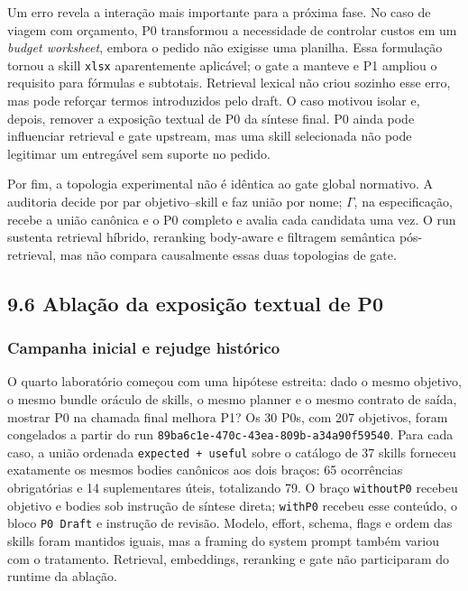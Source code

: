 \documentclass[12pt,a4paper]{article}
\begin{document}
Um erro revela a interação mais importante para a próxima fase. No caso de viagem com orçamento, P0 transformou a necessidade de controlar custos em um \textit{budget worksheet}, embora o pedido não exigisse uma planilha. Essa formulação tornou a skill \texttt{xlsx} aparentemente aplicável; o gate a manteve e P1 ampliou o requisito para fórmulas e subtotais. Retrieval lexical não criou sozinho esse erro, mas pode reforçar termos introduzidos pelo draft. O caso motivou isolar e, depois, remover a exposição textual de P0 da síntese final. P0 ainda pode influenciar retrieval e gate upstream, mas uma skill selecionada não pode legitimar um entregável sem suporte no pedido.

Por fim, a topologia experimental não é idêntica ao gate global normativo. A auditoria decide por par objetivo--skill e faz união por nome; \(\Gamma\), na especificação, recebe a união canônica e o P0 completo e avalia cada candidata uma vez. O run sustenta retrieval híbrido, reranking body-aware e filtragem semântica pós-retrieval, mas não compara causalmente essas duas topologias de gate.

\subsection*{9.6 Ablação da exposição textual de P0}

\subsubsection*{Campanha inicial e rejudge histórico}

O quarto laboratório começou com uma hipótese estreita: dado o mesmo objetivo, o mesmo bundle oráculo de skills, o mesmo planner e o mesmo contrato de saída, mostrar P0 na chamada final melhora P1? Os 30 P0s, com 207 objetivos, foram congelados a partir do run \texttt{89ba6c1e-470c-43ea-809b-a34a90f59540}. Para cada caso, a união ordenada \texttt{expected + useful} sobre o catálogo de 37 skills forneceu exatamente os mesmos bodies canônicos aos dois braços: 65 ocorrências obrigatórias e 14 suplementares úteis, totalizando 79. O braço \texttt{withoutP0} recebeu objetivo e bodies sob instrução de síntese direta; \texttt{withP0} recebeu esse conteúdo, o bloco \texttt{P0 Draft} e instrução de revisão. Modelo, effort, schema, flags e ordem das skills foram mantidos iguais, mas a framing do system prompt também variou com o tratamento. Retrieval, embeddings, reranking e gate não participaram do runtime da ablação.
\end{document}
